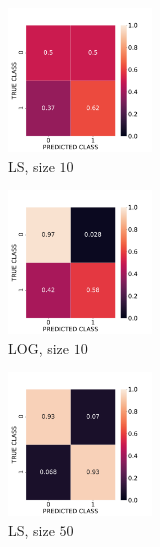 \documentclass[12pt, a4 paper]{article}
\begin{document}

\label{prob:1.c}

\begin{figure}[!htbp]
\centering
    \begin{subfigure}[!htbp]{0.2\textwidth}
       \centering
       \includegraphics[width=1.5in]{../results/ex1/acc_LS_dataset_Normal_size_10.pdf}
       \caption{LS, size $10$}
       \label{fig:LS_P1a_10}
    \end{subfigure}
\quad
    \begin{subfigure}[!htbp]{0.2\textwidth}
       \centering
       \includegraphics[width=1.5in]{../results/ex1/acc_LOG_dataset_Normal_size_10.pdf}
       \caption{LOG, size $10$}
       \label{fig:LOG_P1a_10}
    \end{subfigure}
\quad  
    \begin{subfigure}[!htbp]{0.2\textwidth}
       \centering
       \includegraphics[width=1.5in]{../results/ex1/acc_LS_dataset_Normal_size_50.pdf}
       \caption{LS, size $50$}
       \label{fig:LS_P1a_50}
    \end{subfigure}
\quad
    \begin{subfigure}[!htbp]{0.2\textwidth}

\end{subfigure}
\end{figure}
\end{document}
